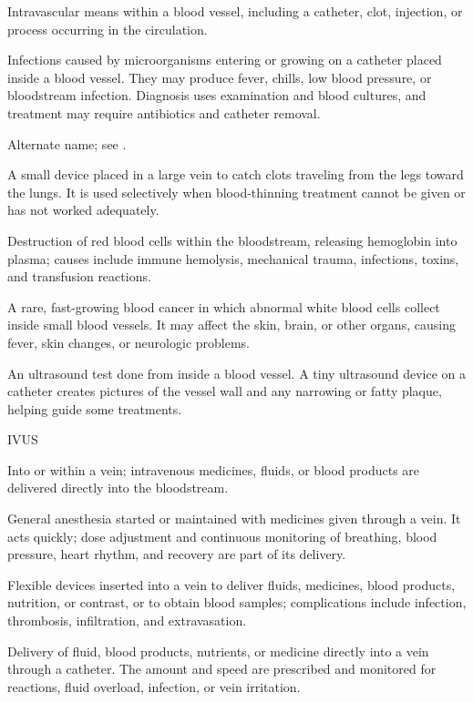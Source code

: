  Intravascular means within a blood vessel, including a catheter, clot, injection, or process occurring in the circulation.

 Infections caused by microorganisms entering or growing on a catheter placed inside a blood vessel. They may produce fever, chills, low blood pressure, or bloodstream infection. Diagnosis uses examination and blood cultures, and treatment may require antibiotics and catheter removal.

 Alternate name; see .

 A small device placed in a large vein to catch clots traveling from the legs toward the lungs. It is used selectively when blood-thinning treatment cannot be given or has not worked adequately.

 Destruction of red blood cells within the bloodstream, releasing hemoglobin into plasma; causes include immune hemolysis, mechanical trauma, infections, toxins, and transfusion reactions.

 A rare, fast-growing blood cancer in which abnormal white blood cells collect inside small blood vessels. It may affect the skin, brain, or other organs, causing fever, skin changes, or neurologic problems.

 An ultrasound test done from inside a blood vessel. A tiny ultrasound device on a catheter creates pictures of the vessel wall and any narrowing or fatty plaque, helping guide some treatments.

\synonyms
IVUS

 Into or within a vein; intravenous medicines, fluids, or blood products are delivered directly into the bloodstream.

 General anesthesia started or maintained with medicines given through a vein. It acts quickly; dose adjustment and continuous monitoring of breathing, blood pressure, heart rhythm, and recovery are part of its delivery.

 Flexible devices inserted into a vein to deliver fluids, medicines, blood products, nutrition, or contrast, or to obtain blood samples; complications include infection, thrombosis, infiltration, and extravasation.

 Delivery of fluid, blood products, nutrients, or medicine directly into a vein through a catheter. The amount and speed are prescribed and monitored for reactions, fluid overload, infection, or vein irritation.


